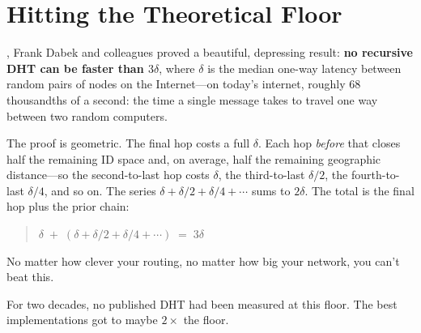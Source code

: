 \documentclass[nobib]{tufte-handout}
\begin{document}
\section{Hitting the Theoretical Floor}

, Frank Dabek and colleagues proved a beautiful, depressing result: \textbf{no recursive DHT can be faster than $3\delta$}, where $\delta$ is the median one-way latency between random pairs of nodes on the Internet---on today's internet, roughly 68 thousandths of a second: the time a single message takes to travel one way between two random computers.

The proof is geometric. The final hop costs a full $\delta$. Each hop \emph{before} that closes half the remaining ID space and, on average, half the remaining geographic distance---so the second-to-last hop costs $\delta$, the third-to-last $\delta/2$, the fourth-to-last $\delta/4$, and so on. The series $\delta + \delta/2 + \delta/4 + \cdots$ sums to $2\delta$. The total is the final hop plus the prior chain:

\begin{quote}
\centering
$\delta \;+\; (\delta + \delta/2 + \delta/4 + \cdots) \;=\; 3\delta$
\end{quote}

No matter how clever your routing, no matter how big your network, you can't beat this.

For two decades, no published DHT had been measured at this floor. The best implementations got to maybe $2\times$ the floor.
\end{document}
